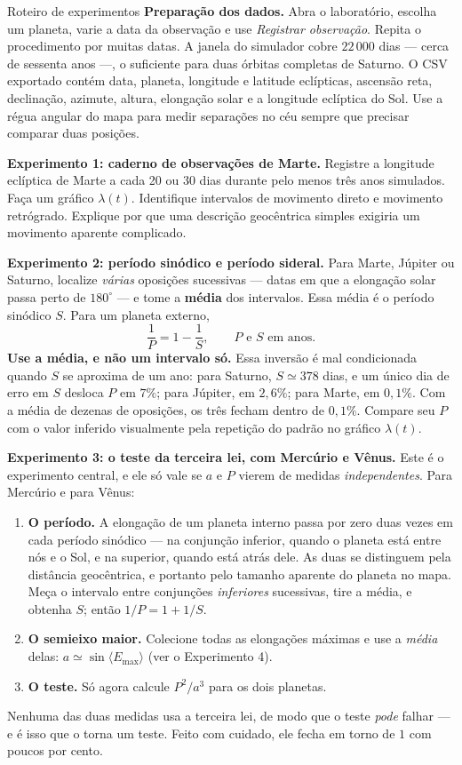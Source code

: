 \documentclass[11pt,a4paper]{article}
\begin{document}
\begin{lessonblock}[borderline west={2pt}{0pt}{astroGold}]{Roteiro de experimentos}
\textbf{Preparação dos dados.} Abra o laboratório, escolha um planeta, varie a data da observação e use
\textit{Registrar observação}. Repita o procedimento por muitas datas. A janela do simulador cobre
$22\,000$ dias --- cerca de sessenta anos ---, o suficiente para duas órbitas completas de Saturno. O CSV
exportado contém data, planeta, longitude e latitude eclípticas, ascensão reta, declinação, azimute, altura,
elongação solar e a longitude eclíptica do Sol. Use a régua angular do mapa para medir separações no céu
sempre que precisar comparar duas posições.

\textbf{Experimento 1: caderno de observações de Marte.}
Registre a longitude eclíptica de Marte a cada 20 ou 30 dias durante pelo menos três anos simulados. Faça um
gráfico $\lambda(t)$. Identifique intervalos de movimento direto e movimento retrógrado. Explique por que uma
descrição geocêntrica simples exigiria um movimento aparente complicado.

\textbf{Experimento 2: período sinódico e período sideral.}
Para Marte, Júpiter ou Saturno, localize \emph{várias} oposições sucessivas --- datas em que a elongação solar
passa perto de $180^\circ$ --- e tome a \textbf{média} dos intervalos. Essa média é o período sinódico $S$.
Para um planeta externo,
\[
\frac{1}{P}=1-\frac{1}{S},
\qquad P\text{ e }S\text{ em anos.}
\]
\textbf{Use a média, e não um intervalo só.} Essa inversão é mal condicionada quando $S$ se aproxima de um ano:
para Saturno, $S\simeq378$ dias, e um único dia de erro em $S$ desloca $P$ em $7\%$; para Júpiter, em $2{,}6\%$;
para Marte, em $0{,}1\%$. Com a média de dezenas de oposições, os três fecham dentro de $0{,}1\%$. Compare seu
$P$ com o valor inferido visualmente pela repetição do padrão no gráfico $\lambda(t)$.

\textbf{Experimento 3: o teste da terceira lei, com Mercúrio e Vênus.}
Este é o experimento central, e ele só vale se $a$ e $P$ vierem de medidas \emph{independentes}. Para Mercúrio
e para Vênus:
\begin{enumerate}
\item \textbf{O período.} A elongação de um planeta interno passa por zero duas vezes em cada período
sinódico --- na conjunção inferior, quando o planeta está entre nós e o Sol, e na superior, quando está atrás
dele. As duas se distinguem pela distância geocêntrica, e portanto pelo tamanho aparente do planeta no mapa.
Meça o intervalo entre conjunções \emph{inferiores} sucessivas, tire a média, e obtenha $S$; então
$1/P=1+1/S$.
\item \textbf{O semieixo maior.} Colecione todas as elongações máximas e use a \emph{média} delas:
$a\simeq\sin\langle E_{\max}\rangle$ (ver o Experimento 4).
\item \textbf{O teste.} Só agora calcule $P^2/a^3$ para os dois planetas.
\end{enumerate}
Nenhuma das duas medidas usa a terceira lei, de modo que o teste \emph{pode} falhar --- e é isso que o torna um
teste. Feito com cuidado, ele fecha em torno de $1$ com poucos por cento.


\end{lessonblock}
\end{document}
